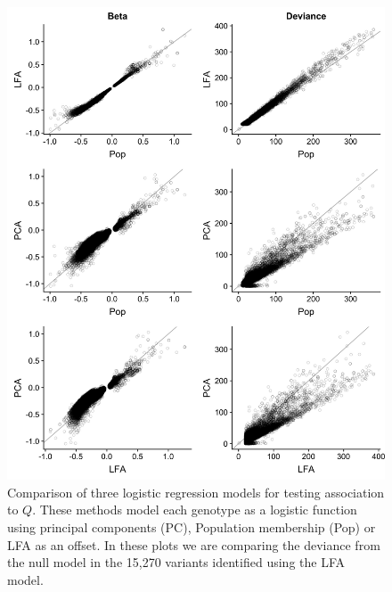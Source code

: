 \documentclass[9pt,article]{template}
\begin{document}
\begin{figure}
\centering
\includegraphics[width=13cm,keepaspectratio]{fits_Significant_Positions_CompareModels.jpg}
\caption{Comparison of three logistic regression models for testing association to $Q$.
These methods model each genotype as a logistic function using principal components (PC), Population membership (Pop) or LFA as an offset.
In these plots we are comparing the deviance from the null model in the 15,270 variants identified using the LFA model.}  
\label{CompareModel}
\end{figure}
\end{document}
